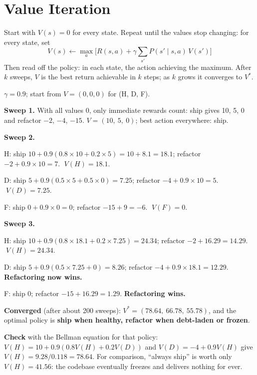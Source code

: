 \section{Value Iteration}

\begin{definitionbox}
Start with $V(s) = 0$ for every state. Repeat until the values stop changing: for
every state, set
\[
V(s) \leftarrow \max_a\Big[R(s, a) + \gamma\sum_{s'} P(s' \mid s, a)\,V(s')\Big]
\]
Then read off the policy: in each state, the action achieving the maximum. After $k$
sweeps, $V$ is the best return achievable in $k$ steps; as $k$ grows it converges to
$V^{*}$.
\end{definitionbox}

\begin{worked}
$\gamma = 0.9$; start from $V = (0, 0, 0)$ for (H, D, F).

\smallskip
\textbf{Sweep 1.} With all values 0, only immediate rewards count: ship gives 10, 5, 0
and refactor $-2$, $-4$, $-15$. $V = (10,\ 5,\ 0)$; best action everywhere: ship.

\textbf{Sweep 2.}
\begin{tight}
  \item H: ship $10 + 0.9(0.8 \times 10 + 0.2 \times 5) = 10 + 8.1 = 18.1$; refactor
        $-2 + 0.9 \times 10 = 7$. $\;V(H) = 18.1$.
  \item D: ship $5 + 0.9(0.5 \times 5 + 0.5 \times 0) = 7.25$; refactor $-4 + 0.9 \times 10
        = 5$. $\;V(D) = 7.25$.
  \item F: ship $0 + 0.9 \times 0 = 0$; refactor $-15 + 9 = -6$. $\;V(F) = 0$.
\end{tight}
\textbf{Sweep 3.}
\begin{tight}
  \item H: ship $10 + 0.9(0.8 \times 18.1 + 0.2 \times 7.25) = 24.34$; refactor $-2 +
        16.29 = 14.29$. $\;V(H) = 24.34$.
  \item D: ship $5 + 0.9(0.5 \times 7.25 + 0) = 8.26$; refactor $-4 + 0.9 \times 18.1 =
        \mathbf{12.29}$. \textbf{Refactoring now wins.}
  \item F: ship $0$; refactor $-15 + 16.29 = \mathbf{1.29}$. \textbf{Refactoring wins.}
\end{tight}
\textbf{Converged} (after about 200 sweeps): $V^{*} = (78.64,\ 66.78,\ 55.78)$, and the
optimal policy is \textbf{ship when healthy, refactor when debt-laden or frozen}.

\smallskip
\textbf{Check} with the Bellman equation for that policy:
$V(H) = 10 + 0.9(0.8V(H) + 0.2V(D))$ and $V(D) = -4 + 0.9V(H)$ give
$V(H) = 9.28/0.118 = 78.64$. For comparison, ``always ship'' is worth only
$V(H) = 41.56$: the codebase eventually freezes and delivers nothing for ever.
\end{worked}

